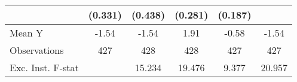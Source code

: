 {\begin{tabular}{l*{5}{c}}
            &     (0.331)         &     (0.438)         &     (0.281)         &     (0.187)         &                     \\
\midrule
Mean Y      &       -1.54         &       -1.54         &        1.91         &       -0.58         &       -1.54         \\
Observations&         427         &         428         &         428         &         427         &         427         \\
Exc. Inst. F-stat&                     &      15.234         &      19.476         &       9.377         &      20.957         \\
\bottomrule
\end{tabular}
}
